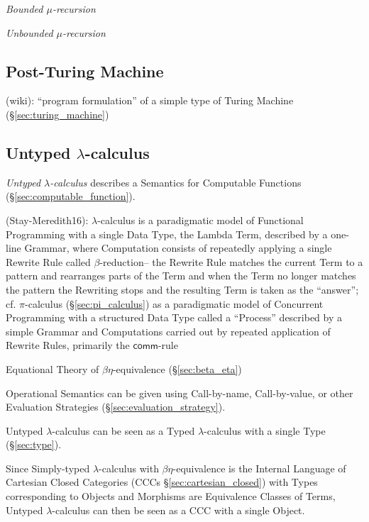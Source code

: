 \emph{Bounded $\mu$-recursion}

\emph{Unbounded $\mu$-recursion}



\subsection{Post-Turing Machine}\label{sec:post_turing}

(wiki): ``program formulation'' of a simple type of Turing Machine
(\S\ref{sec:turing_machine})



\subsection{Untyped $\lambda$-calculus}\label{sec:untyped_lambda}

\emph{Untyped $\lambda$-calculus} describes a Semantics for Computable
Functions (\S\ref{sec:computable_function}).

(Stay-Meredith16): $\lambda$-calculus is a paradigmatic model of Functional
Programming with a single Data Type, the Lambda Term, described by a one-line
Grammar, where Computation consists of repeatedly applying a single Rewrite Rule
called $\beta$-reduction-- the Rewrite Rule matches the current Term to a
pattern and rearranges parts of the Term and when the Term no longer matches the
pattern the Rewriting stops and the resulting Term is taken as the ``answer'';
cf. $\pi$-calculus (\S\ref{sec:pi_calculus}) as a paradigmatic model of
Concurrent Programming with a structured Data Type called a ``Process''
described by a simple Grammar and Computations carried out by repeated
application of Rewrite Rules, primarily the $\mathsf{comm}$-rule

\fist Equational Theory of $\beta\eta$-equivalence (\S\ref{sec:beta_eta})

Operational Semantics can be given using Call-by-name, Call-by-value, or other
Evaluation Strategies (\S\ref{sec:evaluation_strategy}).

Untyped $\lambda$-calculus can be seen as a Typed $\lambda$-calculus
with a single Type (\S\ref{sec:type}).

Since Simply-typed $\lambda$-calculus with $\beta\eta$-equivalence is the
Internal Language of Cartesian Closed Categories (CCCs
\S\ref{sec:cartesian_closed}) with Types corresponding to Objects and Morphisms
are Equivalence Classes of Terms, Untyped $\lambda$-calculus can then be seen
as a CCC with a single Object.

